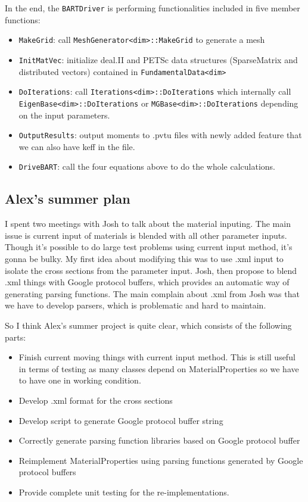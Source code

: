 \documentclass{article}
\begin{document}
In the end, the {\tt BARTDriver} is performing functionalities included in five member 
functions:
\begin{itemize}
	\item {\tt MakeGrid}: call {\tt MeshGenerator<dim>::MakeGrid} to generate a mesh
	\item {\tt InitMatVec}: initialize deal.II and PETSc data structures (SparseMatrix and distributed vectors) contained in {\tt FundamentalData<dim>}
	\item {\tt DoIterations}: call {\tt Iterations<dim>::DoIterations} which internally call {\tt EigenBase<dim>::DoIterations} or {\tt MGBase<dim>::DoIterations} depending on the input parameters.
	\item {\tt OutputResults}: output moments to .pvtu files with newly added feature that we can also have keff in the file.
	\item {\tt DriveBART}: call the four equations above to do the whole calculations.
\end{itemize}

\subsection{Alex's summer plan}
I spent two meetings with Josh to talk about the material inputing. The main issue is 
current input of materials is blended with all other parameter inputs. Though it's 
possible to do large test problems using current input method, it's gonna be bulky. My
first idea about modifying this was to use .xml input to isolate the cross sections from
the parameter input. Josh, then propose to blend .xml things with {Google protocol buffers}, which provides an automatic way of generating parsing functions. The main complain about .xml from Josh was that we have to develop parsers,
which is problematic and hard to maintain.

So I think Alex's summer project is quite clear, which consists of the following parts:
\begin{itemize}
	\item Finish current moving things with current input method. This is still useful in
	terms of testing as many classes depend on MaterialProperties so we have to have
	one in working condition.
	\item Develop .xml format for the cross sections
	\item Develop script to generate Google protocol buffer string
	\item Correctly generate parsing function libraries based on Google protocol buffer
	\item Reimplement MaterialProperties using parsing functions generated by Google protocol buffers
	\item Provide complete unit testing for the re-implementations.
\end{itemize}
\end{document}
